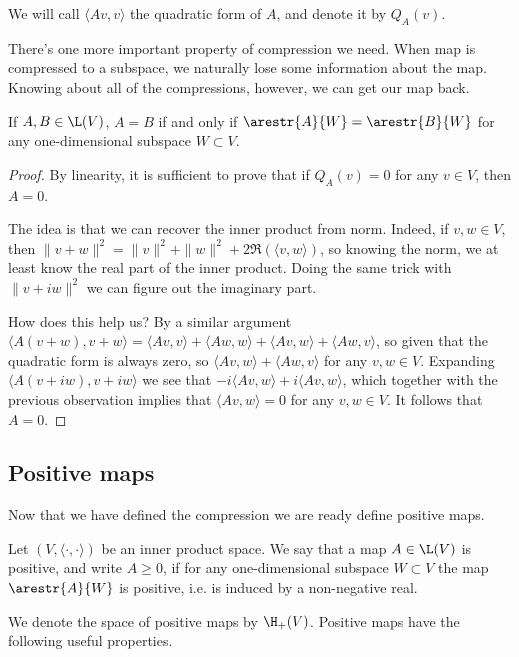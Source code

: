We will call $\langle A v, v \rangle$ the quadratic form of $A$, and denote it by $Q_{A}(v)$.

There's one more important property of compression we need. When map is compressed to a subspace, we naturally lose some information about the map. Knowing about all of the compressions, however, we can get our map back.

\begin{lem}
	If $A, B \in \L(V)$, $A = B$ if and only if $\arestr{A}{W} = \arestr{B}{W}$ for any one-dimensional subspace $W \subset V$.
\end{lem} 
\begin{proof}
	By linearity, it is sufficient to prove that if $Q_{A}(v) = 0$ for any $v \in V$, then $A = 0$.

	The idea is that we can recover the inner product from norm. Indeed, if $v, w \in V$, then $\|v + w\|^2 = \|v\|^2 + \|w\|^2 + 2 \Re(\langle v, w \rangle)$, so knowing the norm, we at least know the real part of the inner product. Doing the same trick with $\|v + i w\|^2$ we can figure out the imaginary part.

	How does this help us? By a similar argument $\langle A(v + w), v + w \rangle = \langle A v, v \rangle + \langle A w, w \rangle + \langle A v, w\rangle + \langle A w, v \rangle$, so given that the quadratic form is always zero, so $\langle A v, w \rangle + \langle A w, v \rangle$ for any $v, w \in V$. Expanding $\langle A (v + i w), v + i w \rangle$ we see that $-i \langle A v, w \rangle + i \langle A v, w \rangle$, which together with the previous observation implies that $\langle A v , w \rangle = 0$ for any $v, w \in V$. It follows that $A = 0$.
\end{proof}

\subsection{Positive maps}

Now that we have defined the compression we are ready define positive maps.

\begin{maar}
	Let $(V, \langle \cdot, \cdot \rangle)$ be an inner product space. We say that a map $A \in \L(V)$ is positive, and write $A \geq 0$, if for any one-dimensional subspace $W \subset V$ the map $\arestr{A}{W}$ is positive, i.e. is induced by a non-negative real.
\end{maar}

We denote the space of positive maps by $\H_{+}(V)$. Positive maps have the following useful properties.

